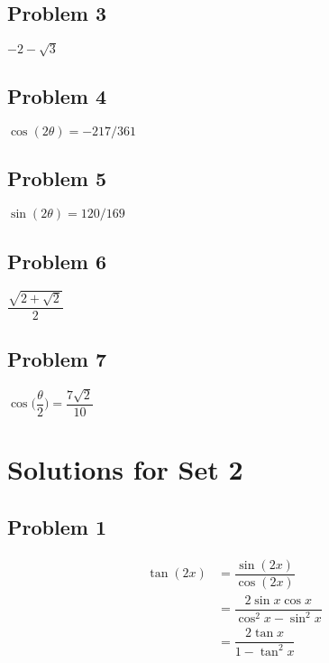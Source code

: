 \documentclass[12pt]{article}
\begin{document}
\subsection*{Problem 3}
\(-2-\sqrt{3}\)
\subsection*{Problem 4}
\(\cos(2\theta)=-217/361\)
\subsection*{Problem 5}
\(\sin(2\theta)=120/169\)
\subsection*{Problem 6}
\(\dfrac{\sqrt{2+\sqrt{2}}}{2}\)
\subsection*{Problem 7}
\(\cos\Big(\dfrac{\theta}{2}\Big)=\dfrac{7\sqrt{2}}{10}\)

\section*{Solutions for Set 2}
\subsection*{Problem 1}
\begin{align*}
    \tan(2x)&=\dfrac{\sin(2x)}{\cos(2x)}\\
    &=\dfrac{2\sin x \cos x}{\cos^2x-\sin^2x}\\
    &=\dfrac{2\tan x}{1-\tan^2x}
\end{align*}
\end{document}
